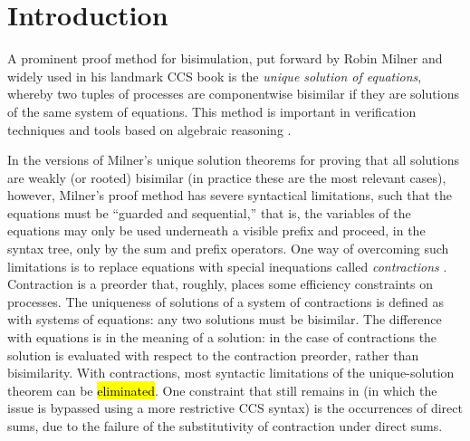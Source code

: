 \section{Introduction}

A prominent proof method for bisimulation, put forward by Robin Milner and widely used in his
landmark CCS book \cite{Mil89} is the
\emph{unique solution of equations}, whereby two tuples of processes are
componentwise bisimilar if they are solutions 
of the same system of equations.
This method is important in verification techniques and tools
based on algebraic reasoning \cite{BaeBOOK,theoryAndPractice,RosUnder10}. 

In the versions of Milner's unique solution theorems for proving that all
solutions are weakly (or rooted) bisimilar (in practice these are the most
relevant cases), however,
Milner's proof method has severe syntactical limitations, such that
the equations must be ``guarded and sequential,'' that is, the
variables of the equations may only be used underneath a visible
prefix and proceed, in the syntax tree, only by the sum and prefix operators.
One way of overcoming such limitations is to replace equations
 with special inequations called
\emph{contractions} \cite{sangiorgi2015equations,sangiorgi2017equations}. Contraction is a
preorder that, roughly, places some efficiency
constraints on processes.  The uniqueness of solutions of a system of contractions
is defined as with systems of equations: any two solutions must be bisimilar.
The difference with equations is in the meaning of a solution:
in the case of contractions the solution is evaluated with respect to
the contraction preorder, rather than bisimilarity. 
With contractions, most syntactic limitations of the unique-solution theorem can be
\hl{eliminated}.  One constraint that still remains in
\cite{sangiorgi2017equations} (in which the issue is bypassed using a more
restrictive CCS syntax)
is the occurrences of direct sums, due to the failure of the
substitutivity of contraction under direct sums.

